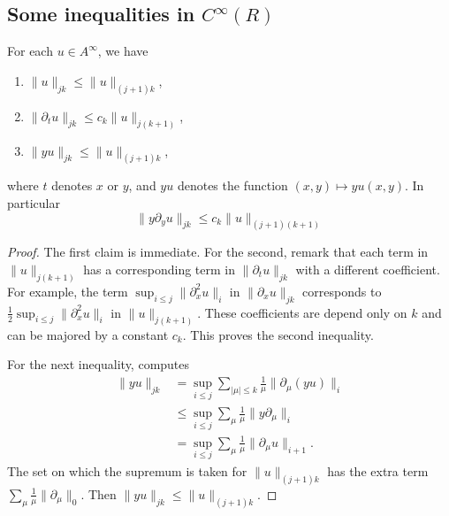 \subsection{Some inequalities in  \texorpdfstring{$C^{\infty}(R)$}{CR}}

\begin{lemma}
For each $u\in A^{\infty}$, we have

\begin{enumerate}
\item $\| u \|_{jk}\leq \| u \|_{(j+1)k}$,
\item $\| \partial_tu \|_{jk}\leq c_k\| u \|_{j(k+1)}$,
\item $\| yu \|_{jk}\leq \| u \|_{(j+1)k}$,
\end{enumerate}
where $t$ denotes $x$ or $y$, and $yu$ denotes the function $(x,y)\mapsto yu(x,y)$.  In particular
\begin{equation}
\| y\partial_yu \|_{jk}\leq c_k\| u \|_{(j+1)(k+1)}
\end{equation}

\end{lemma}

\begin{proof}
The first claim is immediate. For the second, remark that each term in $\| u \|_{j(k+1)}$ has a corresponding term in $\| \partial_tu \|_{jk}$ with a different coefficient. For example, the term $\sup_{i\leq j}\| \partial_x^2u \|_i$ in $\| \partial_xu \|_{jk}$ corresponds to $\frac{ 1 }{2}\sup_{i\leq j}\| \partial_x^2u \|_i$ in $\| u \|_{j(k+1)}$. These coefficients are depend only on $k$ and can be majored by a constant $c_k$. This proves the second inequality.

For the next inequality, computes
\begin{equation}
\begin{split}
  \| yu \|_{jk}&=\sup_{i\leq j}\sum_{|\mu|\leq k}\frac{1}{ \mu }\| \partial_{\mu}(yu) \|_i\\
		&\leq \sup_{i\leq j}\sum_{\mu}\frac{1}{ \mu }\| y\partial_{\mu} \|_i\\
		&=\sup_{i \leq j}\sum_{\mu}\frac{1}{ \mu }\| \partial_{\mu}u \|_{i+1}.	
\end{split}
\end{equation}
The set on which the supremum is taken for $\| u \|_{(j+1)k}$ has the extra term $\sum_{\mu}\frac{1}{ \mu }\| \partial_{\mu}\|_0$. Then $\| yu \|_{jk}\leq \| u \|_{(j+1)k}$.

\end{proof}

